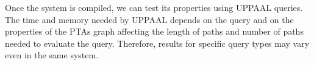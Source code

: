 \documentclass[letterpaper]{article}
\newcommand{\frameImage}[4]{
\begin{figure}[H] 
  \centerline{
    \fcolorbox{frameColor}{white}{
        \texttt{[image: \#1]} } }
    \caption{#4}
    \label{fig:#1}
\end{figure}
}
\begin{document}




Once the system is compiled, we can test its properties using UPPAAL queries. The time and memory needed  by UPPAAL depends on the query and on the properties of the PTAs graph affecting the length of paths and number of paths needed to evaluate the query. Therefore, results for specific query types may vary even in the same system. 





\end{document}
